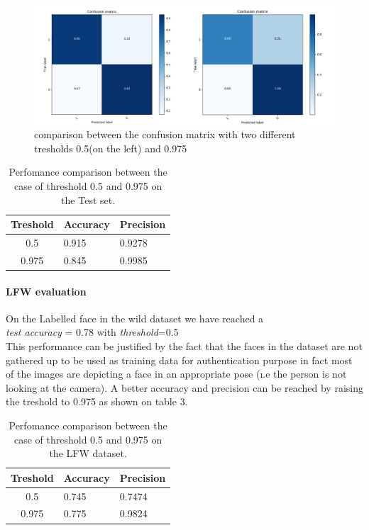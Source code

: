 \begin{figure}
\begin{center}

\includegraphics[width=1\linewidth]{images/merged.png}
\end{center}
   \caption{comparison between the confusion matrix with two different tresholds 0.5(on the left) and 0.975}
\label{fig:conf_matrices}
\end{figure}

\begin{table}[]
\centering
\begin{tabular}{|c|ll|}
\hline
Treshold & Accuracy & Precision \\ \hline
0.5                          & 0.915    & 0.9278     \\ \hline
0.975                          & 0.845    & 0.9985     \\ \hline
\end{tabular}
\caption{Perfomance comparison between the case of threshold 0.5 and 0.975 on the Test set.}
\end{table}

\paragraph{LFW evaluation}
On the Labelled face in the wild dataset we have reached a
\\

\textit{test accuracy }= 0.78 with \textit{threshold}=0.5
\\

This performance can be justified by the fact that the faces in the dataset are not gathered up to be used as training data for authentication purpose in fact most of the images are depicting a face in an appropriate pose (\i.e the person is not looking at the camera). A better accuracy and precision can be reached by raising the treshold to 0.975 as shown on table 3.

\begin{table}[]
\centering
\begin{tabular}{|c|ll|}
\hline
Treshold & Accuracy & Precision \\ \hline
0.5                          & 0.745    & 0.7474     \\ \hline
0.975                          & 0.775    & 0.9824     \\ \hline
\end{tabular}
\caption{Perfomance comparison between the case of threshold 0.5 and 0.975 on the LFW dataset.}
\end{table}

